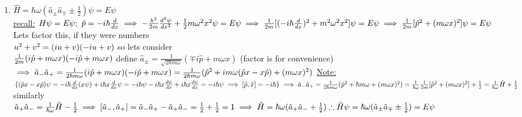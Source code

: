 \documentclass[12pt]{amsart}
\begin{document}
\begin{enumerate}
\item \underline{$\hat{H} = \hbar \omega( \hat{a}_{\pm} \hat{a}_{\mp} \pm \frac{1}{2}) \psi = E \psi$}\\
\underline{recall:} $H \psi = E \psi;\,\, \hat{p} = - i \hbar \frac{d}{dx}\\
\implies - \frac{\hbar^2}{2m} \frac{d^2 \psi}{d x^2}  + \frac{1}{2} m \omega^2 x^2 \psi = E \psi\\
\implies \frac{1}{2m} [(-i \hbar \frac{d}{dx})^2 + m^2 \omega^2 x^2] \psi = E \psi\\
\implies \frac{1}{2m} [ \hat{p}^2 + ( m \omega x)^2] \psi = E \psi \\$
Lets factor this, if they were numbers\\
$u^2 + v^2 = ( i u + v)(-i u + v)\\$
so lets consider\\
$\frac{1}{2m} ( i \hat{p} + m \omega x)(-i \hat{p} + m \omega x)\\$
define $\hat{a}_{\pm} = \frac{1}{\sqrt{2 \hbar m \omega}}( \mp i \hat{p} + m \omega x)$ (factor is for convenience)\\
$\implies \hat{a}_- \hat{a}_+ = \frac{1}{2 \hbar m \omega}  (i \hat{p} + m \omega x)(-i \hat{p} + m \omega x)\\
= \frac{1}{2 \hbar m \omega}( \hat{p}^2 + i m \omega ( \hat{p} x - x \hat{p}) + ( m \omega x)^2)\\$
\underline{Note:} $\{( \hat{p} x - x \hat{p}) \psi = - i \hbar \frac{d}{dx} ( x \psi) + i \hbar x \frac{d}{dx} \psi\\
= - i \hbar \psi - i \hbar x \frac{d\psi}{dx} + i \hbar x \frac{d \psi}{dx} = - i \hbar \psi\\
\implies [ \hat{p}, \hat{x}] = - i \hbar \}\\
\implies \hat{a}_- \hat{a}_+ = \frac{1}{2 \hbar m \omega} ( \hat{p}^2 + \hbar m \omega + ( m \omega x)^2)\\
= \frac{1}{\hbar \omega} \frac{1}{2m} [ \hat{p}^2 + ( m \omega x)^2] + \frac{1}{2} = \frac{1}{\hbar \omega} \hat{H} + \frac{1}{2}\\$
similarly\\
$\hat{a}_+ \hat{a}_- = \frac{1}{\hbar \omega} \hat{H} - \frac{1}{2}\\
\implies [ \hat{a}_-, \hat{a}_+]= \hat{a}_- \hat{a}_+ - \hat{a}_+ \hat{a}_-\\
= \frac{1}{2} + \frac{1}{2} = 1\\
\implies \hat{H} = \hbar \omega ( \hat{a}_+ \hat{a}_- + \frac{1}{2})\\
\therefore \hat{H} \psi = \hbar \omega( \hat{a}_{\pm} \hat{a}_{\mp} \pm \frac{1}{2}) = E \psi$



\end{enumerate}
\end{document}
